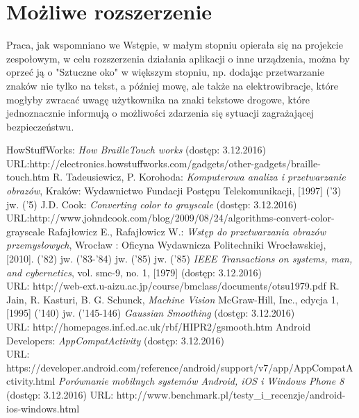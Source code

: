 \documentclass[eng,oneside]{mgr}
\begin{document}
\section{Możliwe rozszerzenie}
Praca, jak wspomniano we Wstępie, w małym stopniu opierała się na projekcie zespołowym, w celu rozszerzenia działania aplikacji o inne urządzenia, można by oprzeć ją o "Sztuczne oko" w większym stopniu, np. dodając przetwarzanie znaków nie tylko na tekst, a później mowę, ale także na elektrowibracje, które mogłyby zwracać uwagę użytkownika na znaki tekstowe drogowe, które jednoznacznie informują o możliwości zdarzenia się sytuacji zagrażającej bezpieczeństwu.
\begin{thebibliography}{99}
 HowStuffWorks: \emph{How BrailleTouch works} (dostęp: 3.12.2016) \\
URL:\hspace{0.1cm}http://electronics.howstuffworks.com/gadgets/other-gadgets/braille-touch.htm
 R. Tadeusiewicz, P. Korohoda: \emph{Komputerowa analiza i przetwarzanie obrazów}, Kraków: Wydawnictwo Fundacji Postępu Telekomunikacji, [1997] ('3)
 jw. ('5)
 J.D. Cook: \emph{Converting color to grayscale} (dostęp: 3.12.2016) \\
URL:\hspace{0.1cm}http://www.johndcook.com/blog/2009/08/24/algorithms-convert-color-grayscale
 Rafajłowicz E., Rafajłowicz W.: \emph {Wstęp do przetwarzania obrazów przemysłowych}, Wrocław : Oficyna Wydawnicza Politechniki Wrocławskiej, [2010]. ('82) 
 jw. ('83-'84)
 jw. ('85)
 jw. ('85)
 \emph{IEEE Transactions on systems, man, and cybernetics}, vol. smc-9, no. 1, [1979] (dostęp: 3.12.2016) \\
URL: http://web-ext.u-aizu.ac.jp/course/bmclass/documents/otsu1979.pdf
 R. Jain, R. Kasturi, B. G. Schunck, \emph{Machine Vision} McGraw-Hill, Inc., edycja 1, [1995] ('140)
 jw. ('145-146)
 \emph{Gaussian Smoothing} (dostęp: 3.12.2016) \\
URL: http://homepages.inf.ed.ac.uk/rbf/HIPR2/gsmooth.htm
 Android Developers: \emph{AppCompatActivity} (dostęp: 3.12.2016) \\
URL: https://developer.android.com/reference/android/support/v7/app/AppCompatActivity.html
 \emph{Porównanie mobilnych systemów Android, iOS i Windows Phone 8} (dostęp: 3.12.2016)
URL: http://www.benchmark.pl/testy\_i\_recenzje/android-ios-windows.html

\end{thebibliography}
\end{document}
